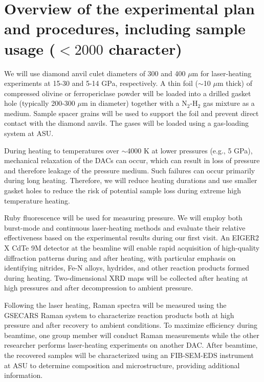 


\section{Overview of the experimental plan and procedures, including sample usage  ($<2000$ character)} 


We will use diamond anvil culet diameters of 300 and 400 $\mu$m for laser-heating experiments at 15-30 and 5-14 GPa, respectively. 
A thin foil ($\sim$10 $\mu$m thick) of compressed olivine or ferropericlase powder will be loaded into a drilled gasket hole (typically 200-300 $\mu$m in diameter) together with a N$_2$-H$_2$ gas mixture as a medium. 
Sample spacer grains will be used to support the foil and prevent direct contact with the diamond anvils. 
The gases will be loaded using a gas-loading system at ASU.

During heating to temperatures over $\sim$4000 K at lower pressures (e.g., 5 GPa), mechanical relaxation of the DACs can occur, which can result in loss of pressure and therefore leakage of the pressure medium. 
Such failures can occur primarily during long heating. 
Therefore, we will reduce heating durations and use smaller gasket holes to reduce the risk of potential sample loss during extreme high temperature heating.

Ruby fluorescence will be used for measuring pressure. 
We will employ both burst-mode and continuous laser-heating methods and evaluate their relative effectiveness based on the experimental results during our first visit. 
An EIGER2 X CdTe 9M detector at the beamline will enable rapid acquisition of high-quality diffraction patterns during and after heating, with particular emphasis on identifying nitrides, Fe-N alloys, hydrides, and other reaction products formed during heating. 
Two-dimensional XRD maps will be collected after heating at high pressures and after decompression to ambient pressure.

Following the laser heating, Raman spectra will be measured using the GSECARS Raman system to characterize reaction products both at high pressure and after recovery to ambient conditions. 
To maximize efficiency during beamtime, one group member will conduct Raman measurements while the other researcher performs laser-heating experiments on another DAC. 
After beamtime, the recovered samples will be characterized using an FIB-SEM-EDS instrument at ASU to determine composition and microstructure, providing additional information.

